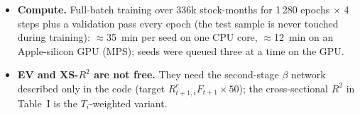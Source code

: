 \documentclass[10pt]{article}
\begin{document}
\begin{itemize}
phases, and starts phase~3 with fresh Adam moments; none of this is in the paper. Our default run fixes $g$ after the
adversary step and selects on the normalized factor. Switching all four back (the ``TF-loop-faithful'' row) lifts
per-seed validation Sharpe to \tfVaMin--\tfVaMax{} (test \tfTeMin--\tfTeMax) and a \nTrialsTf{}-seed ensemble to
\tfSRTe{} out of sample -- these loop details, not the architecture, account for most of the gap to Table~I.
\item \textbf{Compute.} Full-batch training over 336k stock-months for 1\,280 epochs $\times$ 4 steps plus a validation
pass every epoch (the test sample is never touched during training): $\approx$35~min per seed on one CPU core,
$\approx$12~min on an Apple-silicon GPU (MPS); seeds were queued three at a time on the GPU.
\item \textbf{EV and XS-$R^2$ are not free.} They need the second-stage $\beta$ network described only in the code
(target $R^e_{t+1,i}F_{t+1}\times50$); the cross-sectional $R^2$ in Table~I is the $T_i$-weighted variant.
\end{itemize}
\end{document}
